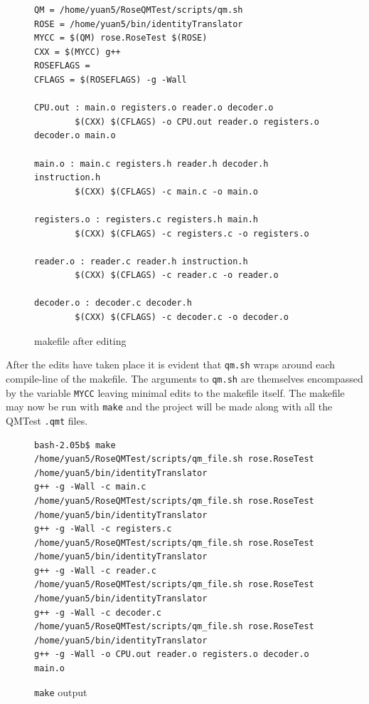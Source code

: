 \begin{figure}[!ht]
{\scriptsize
\begin{verbatim}
QM = /home/yuan5/RoseQMTest/scripts/qm.sh
ROSE = /home/yuan5/bin/identityTranslator
MYCC = $(QM) rose.RoseTest $(ROSE)
CXX = $(MYCC) g++
ROSEFLAGS =
CFLAGS = $(ROSEFLAGS) -g -Wall
                                                                                
CPU.out : main.o registers.o reader.o decoder.o
        $(CXX) $(CFLAGS) -o CPU.out reader.o registers.o decoder.o main.o
                                                                                
main.o : main.c registers.h reader.h decoder.h instruction.h
        $(CXX) $(CFLAGS) -c main.c -o main.o
                                                                                
registers.o : registers.c registers.h main.h
        $(CXX) $(CFLAGS) -c registers.c -o registers.o
                                                                               
reader.o : reader.c reader.h instruction.h
        $(CXX) $(CFLAGS) -c reader.c -o reader.o
                                                                                
decoder.o : decoder.c decoder.h
        $(CXX) $(CFLAGS) -c decoder.c -o decoder.o
\end{verbatim}
}
\caption{makefile after editing}
\end{figure}

After the edits have taken place it is evident that {\tt qm.sh} wraps around
each compile-line of the makefile. The arguments to {\tt qm.sh} are themselves
encompassed by the variable {\tt MYCC} leaving minimal edits to the makefile
itself. The makefile may now be run with {\tt make} and the project will
be made along with all the QMTest {\tt .qmt} files.

\begin{figure}[!ht]
{\scriptsize
\begin{verbatim}
bash-2.05b$ make
/home/yuan5/RoseQMTest/scripts/qm_file.sh rose.RoseTest /home/yuan5/bin/identityTranslator 
g++ -g -Wall -c main.c
/home/yuan5/RoseQMTest/scripts/qm_file.sh rose.RoseTest /home/yuan5/bin/identityTranslator 
g++ -g -Wall -c registers.c
/home/yuan5/RoseQMTest/scripts/qm_file.sh rose.RoseTest /home/yuan5/bin/identityTranslator
g++ -g -Wall -c reader.c
/home/yuan5/RoseQMTest/scripts/qm_file.sh rose.RoseTest /home/yuan5/bin/identityTranslator 
g++ -g -Wall -c decoder.c
/home/yuan5/RoseQMTest/scripts/qm_file.sh rose.RoseTest /home/yuan5/bin/identityTranslator 
g++ -g -Wall -o CPU.out reader.o registers.o decoder.o main.o
\end{verbatim}
}
\caption{{\tt make} output}
\end{figure}

